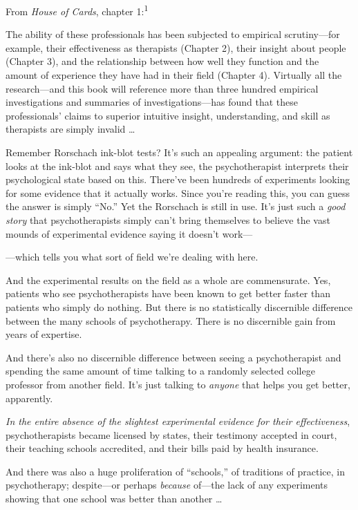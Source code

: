 {
 From \textit{House of Cards}, chapter 1:\textsuperscript{1}}

{
 The ability of these professionals has been subjected to empirical
scrutiny---for example, their effectiveness as therapists (Chapter 2),
their insight about people (Chapter 3), and the relationship between
how well they function and the amount of experience they have had in
their field (Chapter 4). Virtually all the research---and this book
will reference more than three hundred empirical investigations and
summaries of investigations---has found that these
professionals' claims to superior intuitive insight,
understanding, and skill as therapists are simply invalid \ldots}

{
 Remember Rorschach ink-blot tests? It's such an
appealing argument: the patient looks at the ink-blot and says what
they see, the psychotherapist interprets their psychological state
based on this. There've been hundreds of experiments
looking for some evidence that it actually works. Since
you're reading this, you can guess the answer is simply
``No.'' Yet the Rorschach is still
in use. It's just such a \textit{good story} that
psychotherapists simply can't bring themselves to
believe the vast mounds of experimental evidence saying it
doesn't work---}

{
 {}---which tells you what sort of field we're
dealing with here.}

{
 And the experimental results on the field as a whole are
commensurate. Yes, patients who see psychotherapists have been known to
get better faster than patients who simply do nothing. But there is no
statistically discernible difference between the many schools of
psychotherapy. There is no discernible gain from years of expertise.}

{
 And there's also no discernible difference between
seeing a psychotherapist and spending the same amount of time talking
to a randomly selected college professor from another field.
It's just talking to \textit{anyone} that helps you get
better, apparently.}

{
 \textit{In the entire absence of the slightest experimental
evidence for their effectiveness}, psychotherapists became licensed by
states, their testimony accepted in court, their teaching schools
accredited, and their bills paid by health insurance.}

{
 And there was also a huge proliferation of
``schools,'' of traditions of
practice, in psychotherapy; despite---or perhaps \textit{because}
of---the lack of any experiments showing that one school was better
than another \ldots}


